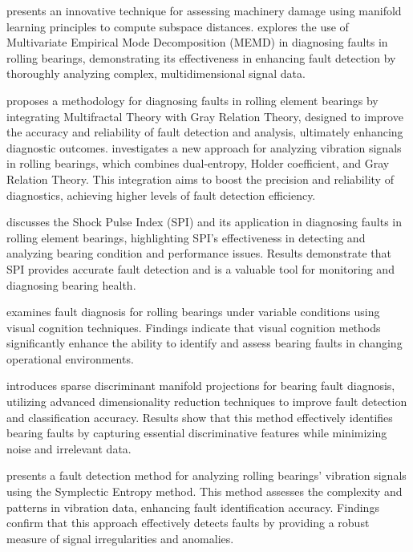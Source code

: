 \documentclass[sn-basic,pdflatex]{sn-jnl}
\theoremstyle{remark}
\theoremstyle{definition}
\begin{document}
\citet{WOS:000366765500038} presents an innovative technique for
assessing machinery damage using manifold learning principles to compute
subspace distances. \citet{WOS:000379556300014} explores the use of
Multivariate Empirical Mode Decomposition (MEMD) in diagnosing faults in
rolling bearings, demonstrating its effectiveness in enhancing fault
detection by thoroughly analyzing complex, multidimensional signal data.

\citet{WOS:000391229300006} proposes a methodology for diagnosing faults
in rolling element bearings by integrating Multifractal Theory with Gray
Relation Theory, designed to improve the accuracy and reliability of
fault detection and analysis, ultimately enhancing diagnostic outcomes.
\citet{WOS:000426819400027} investigates a new approach for analyzing
vibration signals in rolling bearings, which combines dual-entropy,
Holder coefficient, and Gray Relation Theory. This integration aims to
boost the precision and reliability of diagnostics, achieving higher
levels of fault detection efficiency.

\citet{WOS:000398818700108} discusses the Shock Pulse Index (SPI) and
its application in diagnosing faults in rolling element bearings,
highlighting SPI's effectiveness in detecting and analyzing bearing
condition and performance issues. Results demonstrate that SPI provides
accurate fault detection and is a valuable tool for monitoring and
diagnosing bearing health.

\citet{WOS:000404415000016} examines fault diagnosis for rolling
bearings under variable conditions using visual cognition techniques.
Findings indicate that visual cognition methods significantly enhance
the ability to identify and assess bearing faults in changing
operational environments.

\citet{WOS:000401109400020} introduces sparse discriminant manifold
projections for bearing fault diagnosis, utilizing advanced
dimensionality reduction techniques to improve fault detection and
classification accuracy. Results show that this method effectively
identifies bearing faults by capturing essential discriminative features
while minimizing noise and irrelevant data.

\citet{WOS:000419006900041} presents a fault detection method for
analyzing rolling bearings' vibration signals using the Symplectic
Entropy method. This method assesses the complexity and patterns in
vibration data, enhancing fault identification accuracy. Findings
confirm that this approach effectively detects faults by providing a
robust measure of signal irregularities and anomalies.
\end{document}

